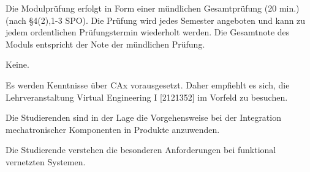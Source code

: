 \begin{course}

\setdoclanguagegerman
{}



\coursehead


\label{cour_7511.dp_997}


\begin{styleenv}
\begin{assessment}
Die Modulprüfung erfolgt in Form einer mündlichen Gesamtprüfung (20 min.) (nach §4(2),1-3 SPO). Die Prüfung wird jedes Semester angeboten und kann zu jedem ordentlichen Prüfungstermin wiederholt werden. Die Gesamtnote des Moduls entspricht der Note der mündlichen Prüfung.


\end{assessment}

\begin{conditions}Keine.\end{conditions}

\begin{recommendations}Es werden Kenntnisse über CAx vorausgesetzt. Daher empfiehlt es sich, die Lehrveranstaltung Virtual Engineering I [2121352] im Vorfeld zu besuchen.

\end{recommendations}
\end{styleenv}

\begin{learningoutcomes}
Die Studierenden sind in der Lage die Vorgehensweise bei der Integration mechatronischer Komponenten in Produkte anzuwenden.

 

Die Studierende verstehen die besonderen Anforderungen bei funktional vernetzten Systemen.


\end{learningoutcomes}
\end{course}
